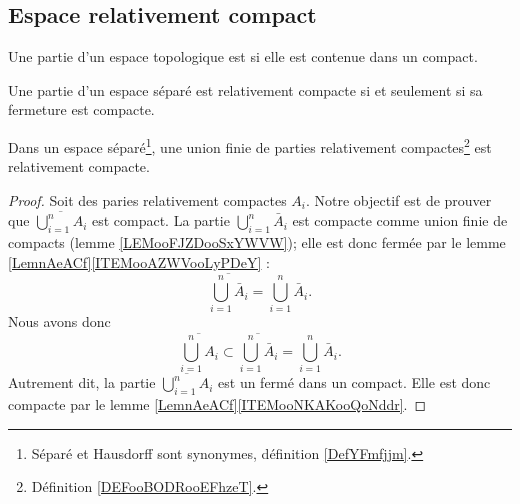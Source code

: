\subsection{Espace relativement compact}

\begin{definition}      \label{DEFooBODRooEFhzeT}
	Une partie d'un espace topologique est  si elle est contenue dans un compact.

\end{definition}

\begin{proposition}	\label{PROPooXKBXooUIwTiO}
	Une partie d'un espace séparé est relativement compacte si et seulement si sa fermeture est compacte.
\end{proposition}

\begin{lemma}		\label{LEMooJXGUooXDGIXG}
	Dans un espace séparé\footnote{Séparé et Hausdorff sont synonymes, définition \ref{DefYFmfjjm}.}, une union finie de parties relativement compactes\footnote{Définition \ref{DEFooBODRooEFhzeT}.} est relativement compacte.
\end{lemma}

\begin{proof}
	Soit des paries relativement compactes \( A_i\). Notre objectif est de prouver que \( \overline{\bigcup_{i=1}^nA_i}\) est compact. La partie \( \bigcup_{i=1}^n\bar A_i\) est compacte comme union finie de compacts (lemme \ref{LEMooFJZDooSxYWVW}); elle est donc fermée par le lemme \ref{LemnAeACf}\ref{ITEMooAZWVooLyPDeY} :
	\begin{equation}
		\overline{\bigcup_{i=1}^n\bar A_i}=\bigcup_{i=1}^n\bar A_i.
	\end{equation}
	Nous avons donc
	\begin{equation}
		\overline{\bigcup_{i=1}^nA_i}\subset\overline{\bigcup_{i=1}^n\bar A_i}=\bigcup_{i=1}^n\bar A_i.
	\end{equation}
	Autrement dit, la partie \( \overline{\bigcup_{i=1}^nA_i}\) est un fermé dans un compact. Elle est donc compacte par le lemme \ref{LemnAeACf}\ref{ITEMooNKAKooQoNddr}.
\end{proof}

